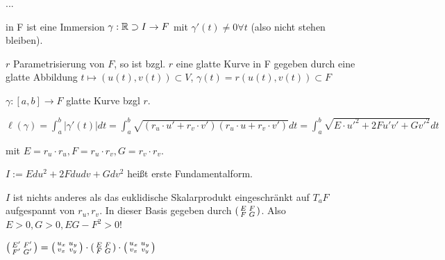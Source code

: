 \begin{defi}[Einheitsnormalenvektoren]
    ... %
\end{defi}

\begin{defi}
    in F ist eine Immersion
    $\gamma:\mathbb R\supset I\to F$ 
    mit $\gamma'(t) \neq 0 \forall t$ (also nicht stehen bleiben).
\end{defi}

\begin{bem}
    $r$ Parametrisierung von $F$, so ist bzgl. $r$ eine glatte Kurve in F gegeben durch
    eine glatte Abbildung $t\mapsto (u(t),v(t))\subset V$, 
    $\gamma(t) = r(u(t), v(t)) \subset F$
\end{bem}

\begin{defi}
    $\gamma:[a,b] \to F$ glatte Kurve bzgl $r$. 

    $\ell(\gamma) = \int_a^b |\gamma'(t)|dt = 
        \int_a^b \sqrt{(r_u\cdot u'+r_v\cdot v')(r_u\cdot u+r_v\cdot v')} dt =
        \int_a^b \sqrt{E\cdot u'^2 + 2Fu'v' + Gv'^2} dt$

    mit $E=r_u\cdot r_u, F=r_u\cdot r_v, G=r_v\cdot r_v$.
    
    $I:= Edu^2 + 2Fdudv + Gdv^2$ heißt erste Fundamentalform.
\end{defi}

\begin{bem}
    $I$ ist nichts anderes als das euklidische Skalarprodukt eingeschränkt auf
    $T_aF$ aufgespannt von $r_u, r_v$.
    In dieser Basis gegeben durch 
    $\begin{psmallmatrix}
        E & F \\ F & G \\
    \end{psmallmatrix}$.
    Also $E>0, G>0, EG-F^2>0$!
\end{bem}

\begin{bem}
    $\begin{psmallmatrix}
        E' & F' \\ F' & G' \\
    \end{psmallmatrix} = 
    \begin{psmallmatrix}
        u_x & u_y \\ v_x & v_y \\
    \end{psmallmatrix}
    \cdot
    \begin{psmallmatrix}
        E & F \\ F & G \\
    \end{psmallmatrix}
    \cdot
    \begin{psmallmatrix}
        u_x & u_y \\ v_x & v_y \\
    \end{psmallmatrix}$
\end{bem}


